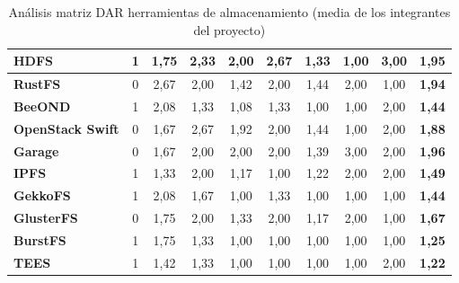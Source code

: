 \begin{table}[H]
\begin{tabular}{|>{\raggedright\arraybackslash\bfseries}p{2.7cm}|c|c|c|c|c|c|c|c|c|}
HDFS & 1 & 1,75 & 2,33 & 2,00 & 2,67 & 1,33 & 1,00 & 3,00 & \textbf{1,95} \\ \hline
\rowcolor{gridrow} RustFS & 0 & 2,67 & 2,00 & 1,42 & 2,00 & 1,44 & 2,00 & 1,00 & \textbf{1,94} \\ \hline
BeeOND & 1 & 2,08 & 1,33 & 1,08 & 1,33 & 1,00 & 1,00 & 2,00 & \textbf{1,44} \\ \hline
\rowcolor{gridrow} OpenStack Swift & 0 & 1,67 & 2,67 & 1,92 & 2,00 & 1,44 & 1,00 & 2,00 & \textbf{1,88} \\ \hline
Garage & 0 & 1,67 & 2,00 & 2,00 & 2,00 & 1,39 & 3,00 & 2,00 & \textbf{1,96} \\ \hline
\rowcolor{gridrow} IPFS & 1 & 1,33 & 2,00 & 1,17 & 1,00 & 1,22 & 2,00 & 2,00 & \textbf{1,49} \\ \hline
GekkoFS & 1 & 2,08 & 1,67 & 1,00 & 1,33 & 1,00 & 1,00 & 1,00 & \textbf{1,44} \\ \hline
\rowcolor{gridrow} GlusterFS & 0 & 1,75 & 2,00 & 1,33 & 2,00 & 1,17 & 2,00 & 1,00 & \textbf{1,67} \\ \hline
BurstFS & 1 & 1,75 & 1,33 & 1,00 & 1,00 & 1,00 & 1,00 & 1,00 & \textbf{1,25} \\ \hline
\rowcolor{gridrow} TEES & 1 & 1,42 & 1,33 & 1,00 & 1,00 & 1,00 & 1,00 & 2,00 & \textbf{1,22} \\ \hline
\end{tabular}
\caption{Análisis matriz DAR herramientas de almacenamiento (media de los integrantes del proyecto)}
\label{tab:matriz-almac}
\end{table}
